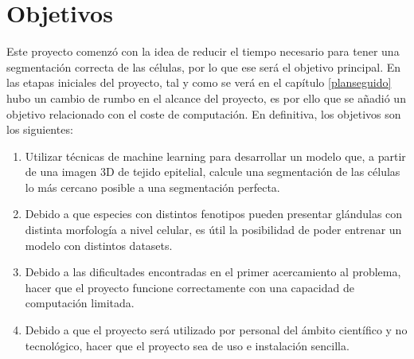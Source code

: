 \chapter{Objetivos}

Este proyecto comenzó con la idea de reducir el tiempo necesario para tener una segmentación correcta de las células, por lo que ese será el objetivo principal. En las etapas iniciales del proyecto, tal y como se verá en el capítulo \ref{planseguido} hubo un cambio de rumbo en el alcance del proyecto, es por ello que se añadió un objetivo relacionado con el coste de computación. En definitiva, los objetivos son los siguientes:

\begin{enumerate}
\item Utilizar técnicas de machine learning para desarrollar un modelo que, a partir de una imagen 3D de tejido epitelial, calcule una segmentación de las células lo más cercano posible a una segmentación perfecta.
\item Debido a que especies con distintos fenotipos pueden presentar glándulas con distinta morfología a nivel celular, es útil la posibilidad de poder entrenar un modelo con distintos datasets.
\item Debido a las dificultades encontradas en el primer acercamiento al problema, hacer que el proyecto funcione correctamente con una capacidad de computación limitada.
\item Debido a que el proyecto será utilizado por personal del ámbito científico y no tecnológico, hacer que el proyecto sea de uso e instalación sencilla.
\end{enumerate}